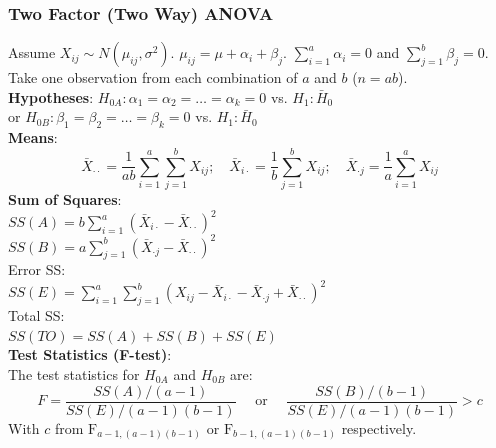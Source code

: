 \documentclass{article}
\begin{document}
\begin{multicols*}{2}
{\color{magenta}\subsubsection*{Two Factor (Two Way) ANOVA}}
Assume $X_{ij} \sim N(\mu_{ij}, \sigma^{2})$. $\mu_{ij} = \mu + \alpha_{i} + \beta_{j}$. $\sum_{i=1}^{a} \alpha_{i} = 0$ and $\sum_{j=1}^{b} \beta_{j} = 0$. Take one observation from each combination of $a$ and $b$ ($n = ab$).\\
\textbf{Hypotheses}: $H_{0A}: \alpha_{1} = \alpha_{2} = \dots = \alpha_{k} = 0$ vs. $H_{1}: \bar{H}_{0}$\\
or $H_{0B}: \beta_{1} = \beta_{2} = \dots = \beta_{k} = 0$ vs. $H_{1}: \bar{H}_{0}$\\
\textbf{Means}:
$$\bar{X}_{\cdot \cdot} = \frac{1}{ab} \sum_{i=1}^{a} \sum_{j=1}^{b} X_{ij}; \quad \bar{X}_{i \cdot} = \frac{1}{b} \sum_{j=1}^{b} X_{ij}; \quad \bar{X}_{\cdot j} = \frac{1}{a} \sum_{i=1}^{a} X_{ij}$$
\textbf{Sum of Squares}:\\
$SS(A) = b \sum_{i=1}^{a} (\bar{X}_{i\cdot} - \bar{X}_{\cdot \cdot})^{2}$\\
$SS(B) = a \sum_{j=1}^{b} (\bar{X}_{\cdot j} - \bar{X}_{\cdot \cdot})^{2}$\\
Error SS:\\
$SS(E) = \sum_{i=1}^{a} \sum_{j=1}^{b} (X_{ij} - \bar{X}_{i\cdot} - \bar{X}_{\cdot j} + \bar{X}_{\cdot \cdot})^{2}$\\
Total SS:\\
$SS(TO) = SS(A) + SS(B) + SS(E)$\\
\textbf{Test Statistics (F-test)}:\\
The test statistics for $H_{0A}$ and $H_{0B}$ are:
$$F = \frac{SS(A) / (a-1)}{SS(E) / (a-1)(b-1)} \quad \mbox{ or } \quad \frac{SS(B) / (b-1)}{SS(E) / (a-1)(b-1)} > c$$
With $c$ from $\mbox{F}_{a-1, (a-1)(b-1)}$ or $\mbox{F}_{b-1, (a-1)(b-1)}$ respectively.


\end{multicols*}
\end{document}
